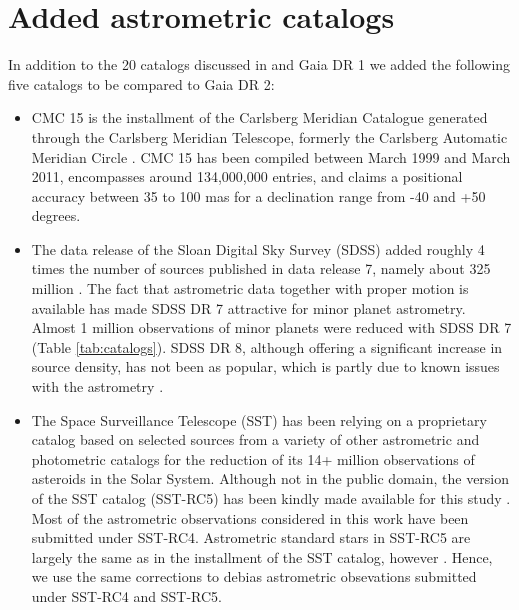 \documentclass[review]{elsarticle}
\begin{document}
\section{Added astrometric catalogs} 
\label{sec:cats}
In addition to the 20 catalogs discussed in \citet{farnocchia15} and Gaia DR 1 we added the following five catalogs to be compared to Gaia DR 2:
\begin{itemize}
\item CMC 15 is the  installment of the Carlsberg Meridian Catalogue generated through the Carlsberg Meridian Telescope, formerly the Carlsberg Automatic Meridian Circle \citep{cmc15}. CMC 15 has been compiled between March 1999 and March 2011, encompasses around 134,000,000 entries, and claims a positional accuracy between 35 to 100 mas for a declination range from -40 and +50 degrees.

\item The  data release of the Sloan Digital Sky Survey (SDSS) added roughly 4 times the number of sources published in data release 7, namely about 325 million \citep{sdss8}. The fact that astrometric data together with proper motion is available has made SDSS DR 7 \citep{sdss7} attractive for minor planet astrometry. Almost 1 million observations of minor planets were reduced with SDSS DR 7 (Table \ref{tab:catalogs}). SDSS DR 8, although offering a significant increase in source density, has not been as popular, which is partly due to known issues with the astrometry \citep{sdss8_astrometry}.         

\item The Space Surveillance Telescope (SST) has been relying on a proprietary catalog based on selected sources from a variety of other astrometric and photometric catalogs for the reduction of its 14+ million observations of asteroids in the Solar System. Although not in the public domain, the  version of the SST catalog (SST-RC5) has been kindly made available for this study \citep{sstrc5}. Most of the astrometric observations considered in this work have been submitted under SST-RC4. Astrometric standard stars in SST-RC5 are largely the same as in the  installment of the SST catalog, however \citep{sstrc5}. Hence, we use the same corrections to debias astrometric obsevations submitted under SST-RC4 and SST-RC5. 


\end{itemize}
\end{document}
